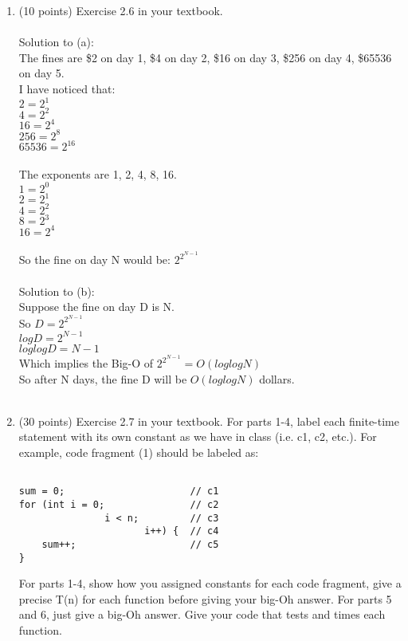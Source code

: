 \documentclass[12pt]{article}
\begin{document}
\begin{enumerate}
\item(10 points) Exercise 2.6 in your textbook. 
\\\\Solution to (a):
\\The fines are \$2 on day 1, \$4 on day 2, \$16 on day 3, \$256 on day 4, \$65536 on day 5.
\\I have noticed that:
\\$2 = 2^1$
\\$4 = 2^2$
\\$16 = 2 ^ 4$
\\$256 = 2 ^8$
\\$65536  = 2^{16}$
\\\\The exponents are 1, 2, 4, 8, 16.
\\$1 = 2^0$
\\$2 = 2^1$
\\$4 = 2^2$
\\$8 = 2^3$
\\$16 = 2^4$
\\\\So the fine on day N would be: $ 2^{2^{N-1}}$
\\\\Solution to (b):
\\Suppose the fine on day D is N.
\\So $D =  2^{2^{N-1}}$
\\$logD = 2^{N-1}$
\\$loglogD = N-1$
\\Which implies the Big-O of $ 2^{2^{N-1}} = O(loglogN)$
\\So after N days, the fine D will be $O(loglogN)$ dollars.
\\\\

\item(30 points) Exercise 2.7 in your textbook. For parts 1-4, label each finite-time statement with its own constant as we have in class (i.e. c1, c2, etc.). For example, code fragment (1) should be labeled as: 

\begin{verbatim}

sum = 0;                      // c1
for (int i = 0;               // c2
               i < n;         // c3
                      i++) {  // c4
    sum++;                    // c5
}

\end{verbatim}

For parts 1-4, show how you assigned constants for each code fragment, give a precise T(n) for each function before giving your big-Oh answer. For parts 5 and 6, just give a big-Oh answer. Give your code that tests and times each function. 


\end{enumerate}
\end{document}
